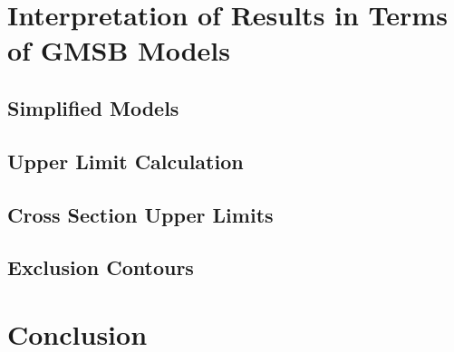 \documentclass[12pt, letterpaper]{report}
\begin{document}
\chapter{Interpretation of Results in Terms of GMSB Models}
\section{Simplified Models}
\section{Upper Limit Calculation}
\section{Cross Section Upper Limits}
\section{Exclusion Contours}

\chapter{Conclusion}
\end{document}
